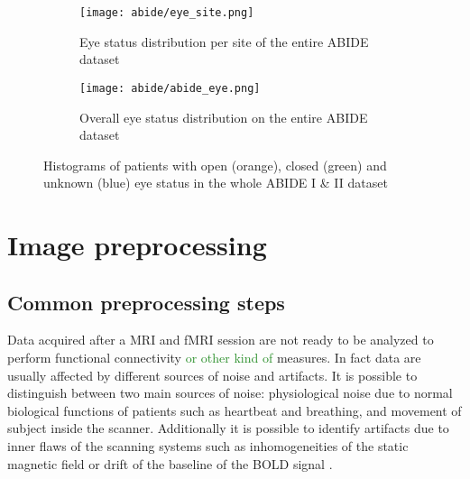 \documentclass[11pt]{report}
\begin{document}
\begin{figure}
\begin{subfigure}{0.7\linewidth}
\texttt{[image: abide/eye\_site.png]}
\caption{Eye status distribution per site of the entire ABIDE dataset}
\label{fig:abideeyesite}
\end{subfigure}
\begin{subfigure}{0.4\linewidth}
\texttt{[image: abide/abide\_eye.png]}
\caption{Overall eye status distribution on the entire ABIDE dataset}
\label{fig:abideeye}
\end{subfigure}
\caption{Histograms of patients with open (orange), closed (green) and unknown (blue) eye status in the whole ABIDE I \& II dataset}
\label{}
\end{figure}







\chapter{Image preprocessing}\label{chap:image_preprocessing}
\section{Common preprocessing steps}
\label{sec:preprocessing_steps}

Data acquired after a MRI and fMRI session are not ready to be analyzed to perform functional connectivity \textcolor{ForestGreen}{or other kind of} measures.
In fact data are usually affected by different sources of noise and artifacts.
It is possible to distinguish between two main sources of noise: physiological noise due to normal biological functions of patients such as heartbeat and breathing, and movement of subject inside the scanner.
Additionally it is possible to identify artifacts due to inner flaws of the scanning systems such as inhomogeneities of the static magnetic field or drift of the baseline of the BOLD signal \cite{bijsterbosch2017}.



\end{document}
